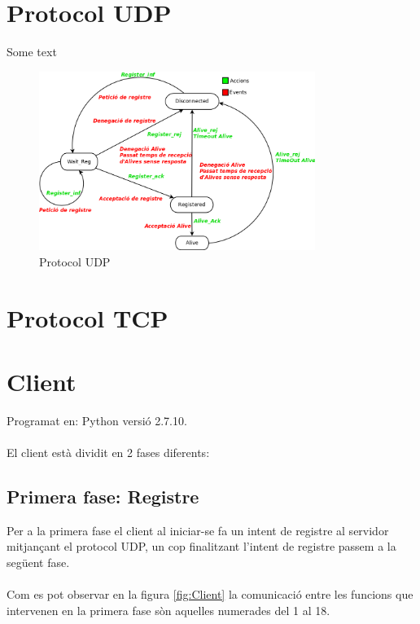 \documentclass[11pt]{article}
\begin{document}
\section{Protocol UDP}
Some text
\begin{figure}[h]
    \centering
    \includegraphics[width=0.8\textwidth]{UDP_diagram.png}
    \caption{Protocol UDP}
    \label{fig:ProtcolUDP}
\end{figure}

\section{Protocol TCP}
\newpage
\section{Client}
\justify
Programat en: Python versió 2.7.10.\\\\
El client està dividit en 2 fases diferents:
\subsection*{Primera fase: Registre}
Per a la primera fase el client al iniciar-se fa un intent de registre al servidor mitjançant el protocol UDP, un cop finalitzant l'intent de registre passem a la següent fase.
\\\\
Com es pot observar en la figura \ref{fig:Client} la comunicació entre les funcions que intervenen en la primera fase sòn aquelles numerades del 1 al 18.
\end{document}
